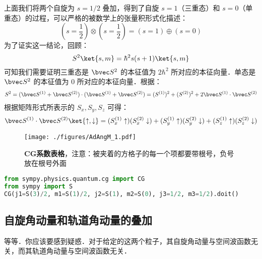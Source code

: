 上面我们将两个自旋为 $s=1/2$ 叠加，得到了自旋 $s=1$（三重态）和 $s=0$（单重态）的过程，可以严格的被数学上的张量积形式化描述：
\begin{equation}
(s=\frac{1}{2})\otimes(s=\frac{1}{2})=(s=1)\oplus (s=0)
\end{equation}
为了证实这一结论，回顾：
\begin{equation}
S^2\ket{s, m} = \hbar^2 s(s+1)\ket{s, m} 
\end{equation}
可知我们需要证明三重态是 $\bvec S^2$ 的本征值为 $2\hbar^2$ 所对应的本征向量．单态是 $\bvec S^2$ 的本征值为 $0$ 所对应的本征向量．根据：
\begin{equation}
S^2=(\bvec S^{(1)}+\bvec S^{(2)})\cdot (\bvec S^{(1)}+\bvec S^{(2)})=( S^{(1)})^2+( S^{(2)})^2+2\bvec S^{(1)}\cdot \bvec S^{(2)}
\end{equation}
根据矩阵形式所表示的 $S_x,S_y,S_z$ 可得：
\begin{align}
\bvec S^{(1)}\cdot \bvec S^{(2)}\ket{\uparrow,\downarrow}=(S_x^{(1)}\uparrow)(S_x^{(2)}\downarrow)+(S_y^{(1)}\uparrow)(S_y^{(2)}\downarrow)+(S_z^{(1)}\uparrow)(S_z^{(2)}\downarrow)

\end{align}
\begin{figure}[ht]
\centering
\texttt{[image: ./figures/AdAngM\_1.pdf]}
\caption{\textbf{CG系数表格}，注意：被夹着的方格子的每一个项都要带根号，负号放在根号外面} \label{AdAngM_fig1}
\end{figure}
\begin{lstlisting}[language=python]
from sympy.physics.quantum.cg import CG
from sympy import S
CG(j1=S(3)/2, m1=S(1)/2, j2=S(1), m2=S(0), j3=1/2, m3=1/2).doit()
\end{lstlisting}

\subsection{自旋角动量和轨道角动量的叠加}
等等．你应该要感到疑惑．对于给定的这两个粒子，其自旋角动量与空间波函数无关，而其轨道角动量与空间波函数无关．
